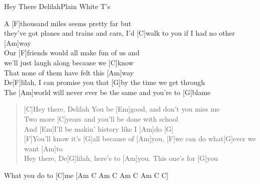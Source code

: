 \begin{song}{Hey There Delilah}{Plain White T's}

    \begin{bridge}  
        A [F]thousand miles seems pretty far but \\
        [G]they've got planes and trains and cars, I'd [C]walk to you if I had no other [Am]way \\
        Our [F]friends would all make fun of us and \\
        [G]we'll just laugh along because we [C]know \\
        That none of them have felt this [Am]way \\
        De[F]lilah, I can promise you that [G]by the time we get through  \\
        The [Am]world will never ever be the same and you're to [G]blame
    \end{bridge}  


    \begin{verse}  
        [C]Hey there, Delilah You be [Em]good, and don't you miss me\\
        Two more [C]years and you'll be done with school\\
        And [Em]I'll be makin' history like I [Am]do\hspace{1em} [G]\\

        [F]You'll know it's [G]all because of [Am]you, [F]we can do what[G]ever we want [Am]to\\
        [F]Hey there, De[G]lilah, here's to [Am]you. This one's for [G]you\\
    \end{verse}  


    What you do to [C]me\hspace{1em} [Am C Am C Am C Am C C]\\

\end{song}
